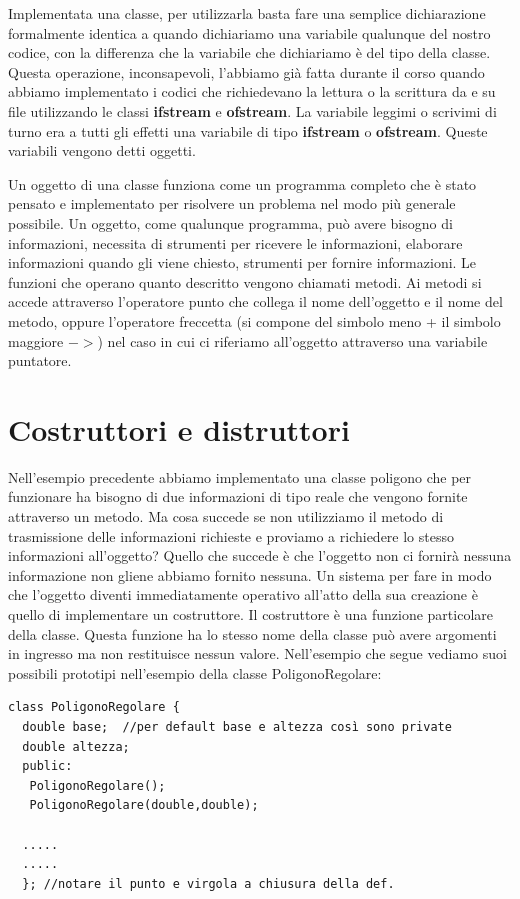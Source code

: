 \documentclass[11pt,fleqn]{book} %
\begin{document}
Implementata una classe, per utilizzarla basta fare una semplice dichiarazione formalmente identica a quando dichiariamo una variabile qualunque del nostro codice, con la differenza che la variabile che dichiariamo è del tipo della classe. Questa operazione, inconsapevoli, l'abbiamo già fatta durante il corso quando abbiamo implementato i codici che richiedevano la lettura o la scrittura da e su file utilizzando le classi \textbf{ifstream} e \textbf{ofstream}. La variabile leggimi o scrivimi di turno era a tutti gli effetti una variabile di tipo \textbf{ifstream} o \textbf{ofstream}. Queste variabili vengono detti oggetti.

Un oggetto di una classe funziona come un programma completo che è stato pensato e implementato per risolvere un problema nel modo più generale possibile. Un oggetto, come qualunque programma, può avere bisogno di informazioni, necessita di strumenti per ricevere le informazioni, elaborare informazioni quando gli viene chiesto, strumenti per fornire informazioni.
Le funzioni che operano quanto descritto vengono chiamati metodi.
Ai metodi si accede attraverso l'operatore punto che collega il nome dell'oggetto e il nome del metodo, oppure l'operatore freccetta (si compone del simbolo meno + il simbolo maggiore $->$) nel caso in cui ci riferiamo all'oggetto attraverso una variabile puntatore.
 
 \section{Costruttori e distruttori}

Nell'esempio precedente abbiamo implementato una classe poligono che per funzionare ha bisogno di due informazioni di tipo reale che vengono fornite attraverso un metodo. Ma cosa succede se non utilizziamo il metodo di trasmissione delle informazioni richieste e proviamo a richiedere lo stesso informazioni all'oggetto? Quello che succede è che l'oggetto non ci fornirà nessuna informazione 
 non gliene abbiamo fornito nessuna.
Un sistema per fare in modo che l'oggetto diventi immediatamente operativo all'atto della sua creazione è quello di implementare un costruttore. Il costruttore è una funzione particolare della classe. Questa funzione ha lo stesso nome della classe può avere argomenti in ingresso ma non restituisce nessun valore. Nell'esempio che segue vediamo suoi possibili prototipi nell'esempio della classe PoligonoRegolare:
 \begin{verbatim}
class PoligonoRegolare {
  double base;  //per default base e altezza così sono private
  double altezza;
  public:
   PoligonoRegolare();
   PoligonoRegolare(double,double);
  
  .....
  .....
  }; //notare il punto e virgola a chiusura della def.
  \end{verbatim}
  
\end{document}
